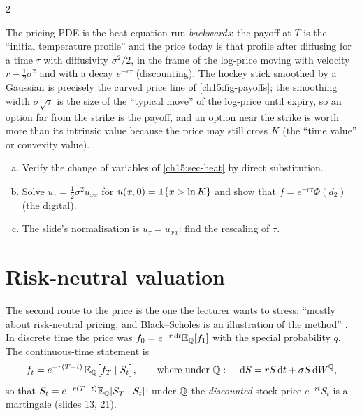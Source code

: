 \begin{paracol}{2}
\begin{intuition}
The pricing PDE is the heat equation run \emph{backwards}: the payoff at $T$ is the ``initial temperature profile'' and the price today is that profile after
diffusing for a time $\tau$ with diffusivity $\sigma^2/2$, in the frame of the log-price moving with velocity $r-\tfrac12\sigma^2$ and with a decay $e^{-r\tau}$ (discounting).
The hockey stick smoothed by a Gaussian is precisely the curved price line of \cref{ch15:fig-payoffs}; the smoothing width
$\sigma\sqrt\tau$ is the size of the ``typical move'' of the log-price until expiry, so an option far from the strike is the payoff, and an option near
the strike is worth more than its intrinsic value because the price may still cross $K$ (the ``time value'' or convexity value).
\end{intuition}

\begin{exercise}\label{ch15:ex-heat}
\leavevmode
\begin{enumerate}[(a)]
  \item Verify the change of variables of \cref{ch15:sec-heat} by direct substitution.
  \item Solve $u_\tau=\frac12\sigma^2u_{xx}$ for $u(x,0)=\mathbf{1}\{x>\ln K\}$ and show that $f=e^{-r\tau}\Phi(d_2)$ (the digital).
  \item The slide's normalisation is $u_\tau=u_{xx}$: find the rescaling of $\tau$.
\end{enumerate}
\end{exercise}


\section{Risk-neutral valuation}\label{ch15:sec-rn}
The second route to the price is the one the lecturer wants to stress: ``mostly about risk-neutral pricing, and Black--Scholes is an illustration of the method''
. In discrete time the price was $f_0=e^{-r\,\mathrm{d} t}\mathbb{E}_{\mathbb{Q}}[f_1]$ with the special probability $q$. The continuous-time statement is
\begin{equation}\label{ch15:eq-rnval}
  f_t=e^{-r(T-t)}\,\mathbb{E}_{\mathbb{Q}}\bigl[f_T\mid S_t\bigr],\qquad
  \text{where under }\mathbb{Q}:\quad \,\mathrm{d} S=rS\,\mathrm{d} t+\sigma S\,\mathrm{d} W^{\mathbb{Q}},
\end{equation}
so that $S_t=e^{-r(T-t)}\mathbb{E}_{\mathbb{Q}}[S_T\mid S_t]$: under $\mathbb{Q}$ the \emph{discounted} stock price $e^{-rt}S_t$ is a martingale (slides 13, 21).


\end{paracol}
